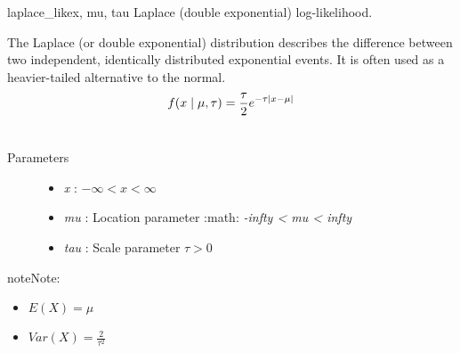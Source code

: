 \hypertarget{pymc.distributions.laplace_like}{}\begin{funcdesc}{laplace\_like}{x, mu, tau}
Laplace (double exponential) log-likelihood.

The Laplace (or double exponential) distribution describes the
difference between two independent, identically distributed exponential
events. It is often used as a heavier-tailed alternative to the normal.
\begin{gather}
\begin{split}f(x \mid \mu, \tau) = \frac{\tau}{2}e^{-\tau |x-\mu|}\end{split}\notag\\\begin{split}\end{split}\notag
\end{gather}\begin{description}
\item[Parameters] \leavevmode\begin{itemize}
\item {} 
\emph{x} : $-\infty < x < \infty$

\item {} 
\emph{mu} : Location parameter :math: \emph{-infty \textless{} mu \textless{} infty}

\item {} 
\emph{tau} : Scale parameter $\tau > 0$

\end{itemize}

\end{description}

\begin{notice}{note}{Note:}\begin{itemize}
\item {} 
$E(X) = \mu$

\item {} 
$Var(X) = \frac{2}{\tau^2}$

\end{itemize}
\end{notice}
\end{funcdesc}

